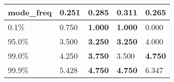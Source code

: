 \begin{table}[H]
\begin{tabular}{|l|m{10em}|m{10em}|m{10em}|m{10em}|}
\hline mode\_freq & 0.251 & 0.285 & \cellcolor[rgb]{0.9, 0.54, 0.52} 0.311 & \bfseries 0.265 \\
\hline 0.1\% & 0.750 & \bfseries 1.000 & \bfseries 1.000 & \cellcolor[rgb]{0.9, 0.54, 0.52} 0.000 \\
\hline 95.0\% & 3.500 & \bfseries 3.250 & \bfseries 3.250 & \cellcolor[rgb]{0.9, 0.54, 0.52} 4.000 \\
\hline 99.0\% & 4.250 & \bfseries 3.750 & \cellcolor[rgb]{0.9, 0.54, 0.52} 3.500 & \bfseries 4.750 \\
\hline 99.9\% & 5.428 & \bfseries 4.750 & \bfseries 4.750 & \cellcolor[rgb]{0.9, 0.54, 0.52} 6.347 \\
\hline
\end{tabular}
\end{table}
